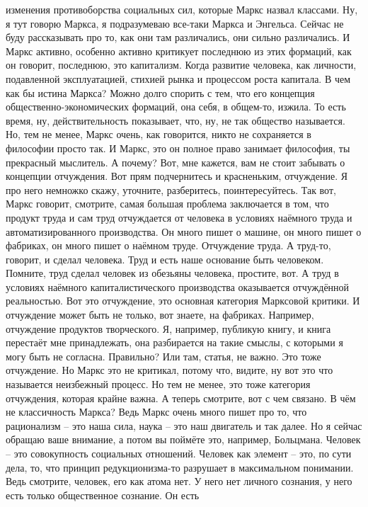 изменения противоборства социальных сил, которые Маркс назвал классами. Ну, я
тут говорю Маркса, я подразумеваю все-таки Маркса и Энгельса. Сейчас не буду
рассказывать про то, как они там различались, они сильно различались. И Маркс
активно, особенно активно критикует последнюю из этих формаций, как он говорит,
последнюю, это капитализм. Когда развитие человека, как личности, подавленной
эксплуатацией, стихией рынка и процессом роста капитала. В чем как бы истина
Маркса? Можно долго спорить с тем, что его концепция общественно-экономических
формаций, она себя, в общем-то, изжила. То есть время, ну, действительность
показывает, что, ну, не так общество называется. Но, тем не менее, Маркс очень,
как говорится, никто не сохраняется в философии просто так. И Маркс, это он
полное право занимает философия, ты прекрасный мыслитель. А почему? Вот, мне
кажется, вам не стоит забывать о концепции отчуждения. Вот прям подчернитесь и
красненьким, отчуждение. Я про него немножко скажу, уточните, разберитесь,
поинтересуйтесь. Так вот, Маркс говорит, смотрите, самая большая проблема
заключается в том, что продукт труда и сам труд отчуждается от человека в
условиях наёмного труда и автоматизированного производства. Он много пишет о
машине, он много пишет о фабриках, он много пишет о наёмном труде. Отчуждение
труда. А труд-то, говорит, и сделал человека. Труд и есть наше основание быть
человеком. Помните, труд сделал человек из обезьяны человека, простите, вот. А
труд в условиях наёмного капиталистического производства оказывается отчуждённой
реальностью. Вот это отчуждение, это основная категория Марксовой критики. И
отчуждение может быть не только, вот знаете, на фабриках. Например, отчуждение
продуктов творческого. Я, например, публикую книгу, и книга перестаёт мне
принадлежать, она разбирается на такие смыслы, с которыми я могу быть не
согласна. Правильно? Или там, статья, не важно. Это тоже отчуждение. Но Маркс
это не критикал, потому что, видите, ну вот это что называется неизбежный
процесс. Но тем не менее, это тоже категория отчуждения, которая крайне важна. А
теперь смотрите, вот с чем связано. В чём не классичность Маркса? Ведь Маркс
очень много пишет про то, что рационализм – это наша сила, наука – это наш
двигатель и так далее. Но я сейчас обращаю ваше внимание, а потом вы поймёте
это, например, Больцмана. Человек – это совокупность социальных отношений.
Человек как элемент – это, по сути дела, то, что принцип редукционизма-то
разрушает в максимальном понимании. Ведь смотрите, человек, его как атома нет. У
него нет личного сознания, у него есть только общественное сознание. Он есть
